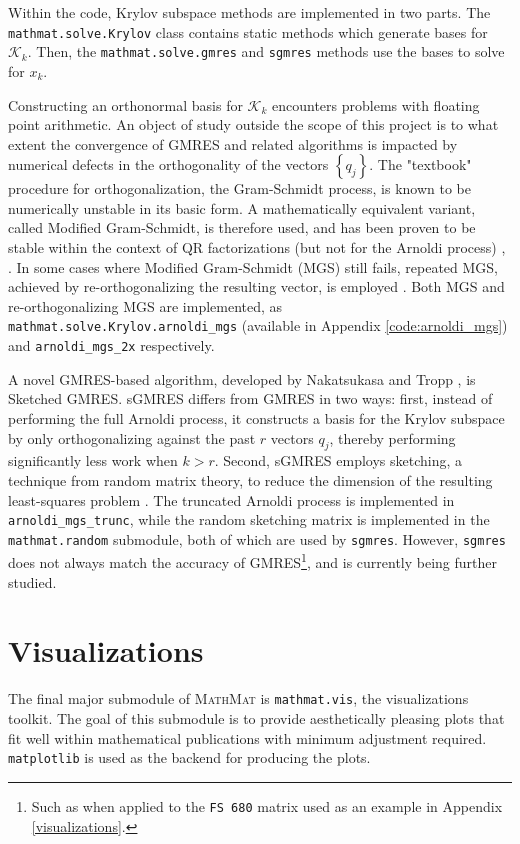 \documentclass[12pt,a4paper]{article}
\newcommand{\mathmat}{\textsc{MathMat} }
\newcommand{\ct}[1]{\texttt{#1}}
\begin{document}
Within the code, Krylov subspace methods are implemented in two parts. The \ct{mathmat.solve.Krylov} class contains static methods which generate bases for $\mathcal{K}_k$. Then, the \ct{mathmat.solve.gmres} and \ct{sgmres} methods use the bases to solve for $x_k$. 

Constructing an orthonormal basis for $\mathcal{K}_k$ encounters problems with floating point arithmetic. An object of study outside the scope of this project is to what extent the convergence of GMRES and related algorithms is impacted by numerical defects in the orthogonality of the vectors $\left\{ q_j \right\}$. The "textbook" procedure for orthogonalization, the Gram-Schmidt process, is known to be numerically unstable in its basic form. A mathematically equivalent variant, called Modified Gram-Schmidt, is therefore used, and has been proven to be stable within the context of QR factorizations (but not for the Arnoldi process) \cite{Matinfar2012}, \cite{Daniel1976}. In some cases where Modified Gram-Schmidt (MGS) still fails, repeated MGS, achieved by re-orthogonalizing the resulting vector, is employed \cite{Daniel1976}. Both MGS and re-orthogonalizing MGS are implemented, as \ct{mathmat.solve.Krylov.arnoldi\_mgs} (available in Appendix \ref{code:arnoldi_mgs}) and \ct{arnoldi\_mgs\_2x} respectively.

A novel GMRES-based algorithm, developed by Nakatsukasa and Tropp \cite{Nakatsukasa2022}, is Sketched GMRES. sGMRES differs from GMRES in two ways: first, instead of performing the full Arnoldi process, it constructs a basis for the Krylov subspace by only orthogonalizing against the past $r$ vectors $q_j$, thereby performing significantly less work when $k > r$. Second, sGMRES employs sketching, a technique from random matrix theory, to reduce the dimension of the resulting least-squares problem \cite{Nakatsukasa2022}. The truncated Arnoldi process is implemented in \ct{arnoldi\_mgs\_trunc}, while the random sketching matrix is implemented in the \ct{mathmat.random} submodule, both of which are used by \ct{sgmres}. However, \ct{sgmres} does not always match the accuracy of GMRES\footnote{Such as when applied to the \ct{FS 680} matrix used as an example in Appendix \ref{visualizations}.}, and is currently being further studied.

\section{Visualizations}

The final major submodule of \mathmat is \ct{mathmat.vis}, the visualizations toolkit. The goal of this submodule is to provide aesthetically pleasing plots that fit well within mathematical publications with minimum adjustment required. \ct{matplotlib} \cite{Matplotlib} is used as the backend for producing the plots.
\end{document}
